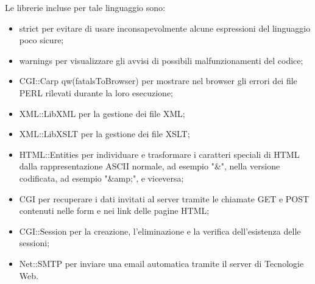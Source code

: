 {	Le librerie incluse per tale linguaggio sono:
	\begin{itemize}\itemsep1pt
		\item strict per evitare di usare inconsapevolmente alcune espressioni del linguaggio poco sicure;
		\item warnings per visualizzare gli avvisi di possibili malfunzionamenti del codice;
		\item CGI::Carp qw(fatalsToBrowser) per mostrare nel browser gli errori dei file PERL rilevati durante la loro esecuzione;
		\item XML::LibXML per la gestione dei file XML;
		\item XML::LibXSLT per la gestione dei file XSLT;
		\item HTML::Entities per individuare e trasformare i caratteri speciali di HTML dalla rappresentazione ASCII normale, ad esempio "\&", nella versione codificata, ad esempio "\&amp;", e viceversa;
		\item CGI per recuperare i dati invitati al server tramite le chiamate GET e POST contenuti nelle form e nei link delle pagine HTML;
		\item CGI::Session per la creazione, l'eliminazione e la verifica dell'esistenza delle sessioni;
		\item Net::SMTP per inviare una email automatica tramite il server di Tecnologie Web.
	 \end{itemize}
}